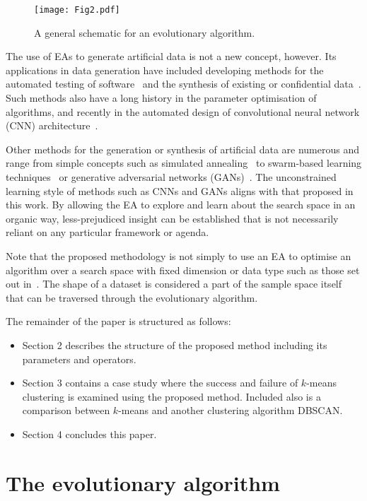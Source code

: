 \documentclass[11pt]{article}
\newlength{\imgwidth}
\begin{document}
\begin{figure}[htbp]
    \centering
    \texttt{[image: Fig2.pdf]}
    \caption{%
        A general schematic for an evolutionary algorithm.
    }\label{fig:flowchart}
\end{figure}

The use of EAs to generate artificial data is not a new concept, however. Its
applications in data generation have included developing methods for the
automated testing of software~\cite{Koleejan2015,Michael2001,Sharifipour2018}
and the synthesis of existing or confidential data~\cite{Chen2016}. Such methods
also have a long history in the parameter optimisation of algorithms, and
recently in the automated design of convolutional neural network (CNN)
architecture~\cite{Suganuma2017,Sun2018}.

Other methods for the generation or synthesis of artificial data are numerous
and range from simple concepts such as simulated annealing~\cite{Matejka2017}
to swarm-based learning techniques~\cite{Abualigah2018b} or generative
adversarial networks (GANs)~\cite{Goodfellow2014}. The unconstrained learning
style of methods such as CNNs and GANs aligns with that proposed in this work.
By allowing the EA to explore and learn about the search space in an organic
way, less-prejudiced insight can be established that is not necessarily reliant
on any particular framework or agenda.

Note that the proposed methodology is not simply to use an EA to optimise an
algorithm over a search space with fixed dimension or data type such as those
set out in~\cite{Chen2016}. The shape of a dataset is considered a part of the
sample space itself that can be traversed through the evolutionary algorithm.

The remainder of the paper is structured as follows:
\begin{itemize}
    \item Section 2 describes the structure of the proposed method including its
        parameters and operators.
    \item Section 3 contains a case study where the success and failure of
        \(k\)-means clustering is examined using the proposed method. Included
        also is a comparison between \(k\)-means and another clustering
        algorithm DBSCAN.\
    \item Section 4 concludes this paper.
\end{itemize}

\section{The evolutionary algorithm}\label{section:algorithm}
\end{document}
